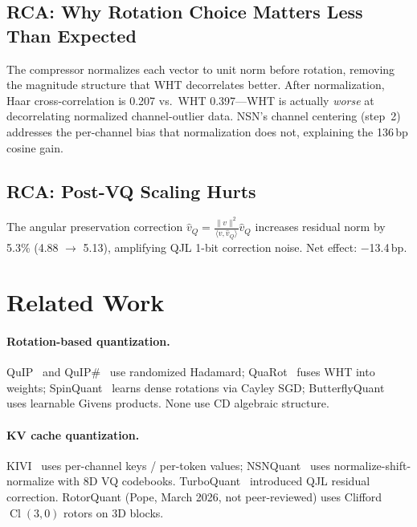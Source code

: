 \documentclass[letterpaper,11pt]{article}
\DeclareMathOperator{\Cl}{Cl}
\newcommand{\norm}[1]{\lVert #1 \rVert}
\newcommand{\inner}[2]{\langle #1, #2 \rangle}
\begin{document}
\subsection{RCA: Why Rotation Choice Matters Less Than Expected}

The compressor normalizes each vector to unit norm before rotation,
removing the magnitude structure that WHT decorrelates better.
After normalization, Haar cross-correlation is 0.207 vs.\ WHT 0.397---WHT
is actually \emph{worse} at decorrelating normalized channel-outlier data.
NSN's channel centering (step~2) addresses the per-channel bias that
normalization does not, explaining the 136\,bp cosine gain.

\subsection{RCA: Post-VQ Scaling Hurts}

The angular preservation correction
$\hat{v}_Q = \frac{\norm{v}^2}{\inner{v}{\hat{v}_Q}} \hat{v}_Q$
increases residual norm by 5.3\% (4.88 $\to$ 5.13), amplifying QJL
1-bit correction noise. Net effect: $-$13.4\,bp.

\section{Related Work}
\label{sec:related}

\paragraph{Rotation-based quantization.}
QuIP~\cite{quip2023} and QuIP\#~\cite{quipsharp2024} use randomized
Hadamard; QuaRot~\cite{quarot2024} fuses WHT into weights;
SpinQuant~\cite{spinquant2024} learns dense rotations via Cayley SGD;
ButterflyQuant~\cite{butterflyquant2025} uses learnable Givens products.
None use CD algebraic structure.

\paragraph{KV cache quantization.}
KIVI~\cite{kivi2024} uses per-channel keys / per-token values;
NSNQuant~\cite{nsnquant2025} uses normalize-shift-normalize with
8D VQ codebooks. TurboQuant~\cite{turboquant2026} introduced QJL
residual correction. RotorQuant (Pope, March 2026, not peer-reviewed)
uses Clifford $\Cl(3,0)$ rotors on 3D blocks.
\end{document}
